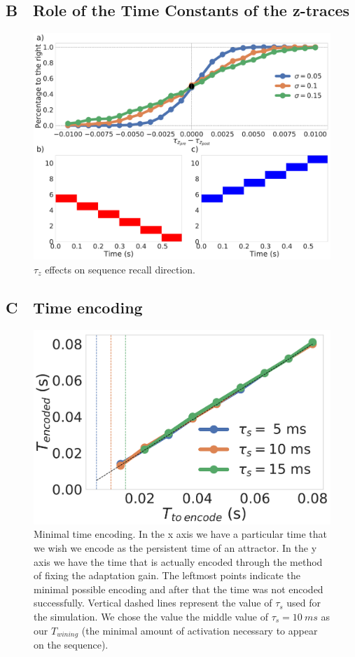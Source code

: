 \documentclass[10pt,a4paper]{article}
\begin{document}
\subsection*{B $\;$ Role of the Time Constants of the z-traces}
\begin{figure}[H]
\centering
\includegraphics[scale=0.20]{asymmetry.pdf}
\caption{$\tau_z$ effects on sequence recall direction. }
\label{fig:z-assymetry}
\end{figure}

\subsection*{C $\;$ Time encoding}
\begin{figure}[H]
\centering
\includegraphics[scale=0.40]{time_encoding.pdf}
\caption{Minimal time encoding. In the x axis we have a particular time that we wish we encode as the persistent time of an attractor. In the y axis we have the time that is actually encoded through the method of fixing the adaptation gain. The leftmost points indicate the minimal possible encoding and after that the time was not encoded successfully. Vertical dashed lines represent the value of $\tau_s$ used for the simulation. We chose the value the middle value of $\tau_s=10 \: ms$  as our $T_{wining}$ (the minimal amount of activation necessary to appear on the sequence).}
\label{fig:min_time_encoding}
\end{figure}
\end{document}
